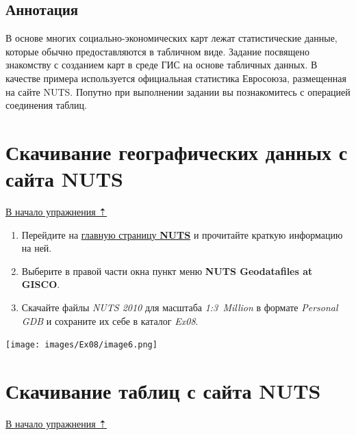 \documentclass[12pt,]{book}
\begin{document}
\hypertarget{stat-map-economic-annotation}{%
\subsection{Аннотация}\label{stat-map-economic-annotation}}

В основе многих социально-экономических карт лежат статистические данные, которые обычно предоставляются в табличном виде. Задание посвящено знакомству с созданием карт в среде ГИС на основе табличных данных. В качестве примера используется официальная статистика Евросоюза, размещенная на сайте NUTS. Попутно при выполнении задании вы познакомитесь с операцией соединения таблиц.

\hypertarget{stat-map-economic-nuts-geo}{%
\section{Скачивание географических данных с сайта NUTS}\label{stat-map-economic-nuts-geo}}

\protect\hyperlink{stat-map-economic}{В начало упражнения ⇡}

\begin{enumerate}
\def\labelenumi{\arabic{enumi}.}
\item
  Перейдите на \href{http://epp.eurostat.ec.europa.eu/portal/page/portal/nuts_nomenclature/introduction}{главную страницу \textbf{NUTS}} и прочитайте краткую информацию на ней.
\item
  Выберите в правой части окна пункт меню \textbf{NUTS Geodatafiles at GISCO}.
\item
  Скачайте файлы \emph{NUTS 2010} для масштаба \emph{1:3~Million} в формате \emph{Personal GDB} и сохраните их себе в каталог \emph{Ex08}.
\end{enumerate}

\texttt{[image: images/Ex08/image6.png]}

\hypertarget{stat-map-economic-nuts-tables}{%
\section{Скачивание таблиц с сайта NUTS}\label{stat-map-economic-nuts-tables}}

\protect\hyperlink{stat-map-economic}{В начало упражнения ⇡}
\end{document}
